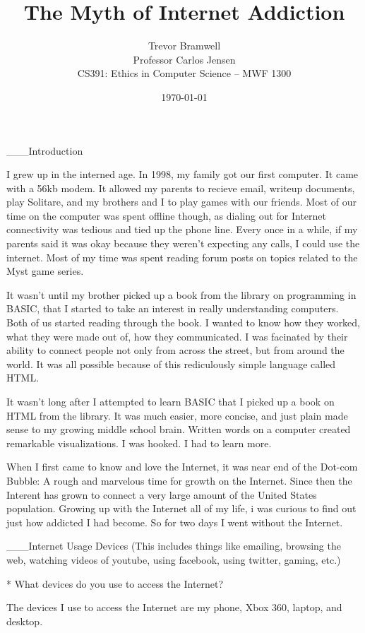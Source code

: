 \documentclass[12pt,letterpaper]{article}
\title{The Myth of Internet Addiction}
\author{
    Trevor Bramwell\\
    Professor Carlos Jensen\\
    CS391: Ethics in Computer Science -- MWF 1300\\
}
\date{\today}
\begin{document}
\maketitle



___Introduction

I grew up in the interned age. In 1998, my family got our first
computer. It came with a 56kb modem. It allowed my parents to recieve
email, writeup documents, play Solitare,  and my brothers and I to play
games with our friends. Most of our time on the computer was spent
offline though, as dialing out for Internet connectivity was tedious and
tied up the phone line. Every once in a while, if my parents said it was
okay because they weren't expecting any calls, I could use the internet.
Most of my time was spent reading forum posts on topics related to the
Myst game series.

It wasn't until my brother picked up a book from the library on
programming in BASIC, that I started to take an interest in really
understanding computers. Both of us started
reading through the book. I wanted to know how they worked, what they
were made out of, how they communicated. I was facinated by their
ability to connect people not only from across the street, but from
around the world. It was all possible because of this rediculously
simple language called HTML. 

It wasn't long after I attempted to learn BASIC that I picked up a book
on HTML from the library. It was much easier, more concise, and just
plain made sense to my growing middle school brain. Written words on a
computer created remarkable visualizations. I was hooked. I had to learn
more.

When I first came to know and love the Internet, it was near end of the
Dot-com Bubble: A rough and marvelous time for growth on the Internet.
Since then the Interent has grown to connect a very large amount of the
United States population. Growing up with the Internet all of my life, i
was curious to find out just how addicted I had become. So for two days
I went without the Internet. 




___Internet Usage Devices
(This includes things like emailing, browsing the web, watching videos
of youtube, using facebook, using twitter, gaming, etc.)


* What devices do you use to access the Internet?

The devices I use to access the Internet are my phone, Xbox 360, laptop,
and desktop.
\end{document}
